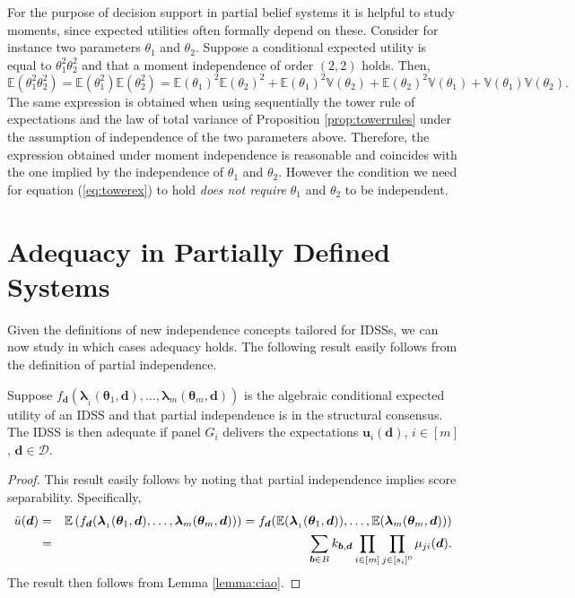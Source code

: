 For the purpose of decision support in partial belief systems it is helpful to study moments, since expected utilities often formally depend on these. Consider for instance two parameters $\theta_1$ and $\theta_2$. Suppose a conditional expected utility is equal to $\theta_1^2\theta_2^2$ and that a moment independence of order $(2,2)$ holds. Then,
\begin{equation}
\mathbb{E}\left(\theta_1^2\theta_2^2\right)=\mathbb{E}\left(\theta_1^2\right)\mathbb{E}\left(\theta_2^2\right)=\mathbb{E}(\theta_1)^2\mathbb{E}(\theta_2)^2+\mathbb{E}(\theta_1)^2\mathbb{V}(\theta_2)+\mathbb{E}(\theta_2)^2\mathbb{V}(\theta_1)+\mathbb{V}(\theta_1)\mathbb{V}(\theta_2).
\label{eq:towerex}
\end{equation}
The same expression is obtained when using sequentially the tower rule of expectations and the law of total variance of Proposition \ref{prop:towerrules} under the assumption of independence of the two parameters above. Therefore, the expression obtained under moment independence is reasonable and coincides with the one implied by the independence of $\theta_1$ and $\theta_2$. However the condition we need for equation (\ref{eq:towerex}) to hold \textit{does not require} $\theta_1$ and $\theta_2$ to be independent. 

\section{Adequacy in Partially Defined Systems}
\label{sec:adequacy1}

 Given the definitions of new independence concepts tailored for IDSSs, we can now study in which cases adequacy holds. The following result easily follows from the definition of partial independence.
 
\begin{lemma}
\label{lemma:ciaociao}
Suppose $f_{\bm{d}}(\bm{\lambda }_{_{1}}(\bm{\theta }_{1},\bm{d}),\dots,\bm{\lambda }_{m}(\bm{\theta }_{m},\bm{d}))$ is the algebraic conditional expected utility of an IDSS and that partial independence is in the structural consensus. The IDSS is then adequate if panel $G_i$ delivers the expectations $\bm{u}_i(\bm{d})$, $i\in[m]$, $\bm{d}\in\bm{\mathcal{D}}$.
\end{lemma}
\begin{proof}
This result easily follows by noting that partial independence implies score separability. Specifically,
\begin{eqnarray*}
\bar{u}(\bm{d})&=&\mathbb{E}\left(f_{\bm{d}}(\bm{\lambda }_{_{1}}(\bm{\theta }_{1},\bm{d}),\dots,\bm{\lambda }_{m}(\bm{\theta }_{m},\bm{d}))\right)=f_{\bm{d}}(\mathbb{E}(\bm{\lambda }_{_{1}}(\bm{\theta }_{1},\bm{d})),\dots,\mathbb{E}(\bm{\lambda }_{m}(\bm{\theta }_{m},\bm{d})))\\
&=&\sum_{\bm{b}\in B}k_{\bm{b},\bm{d}} \prod_{i\in[m]}\prod_{j\in[s_i]^0}\mu_{ji}(\bm{d}).
\end{eqnarray*}
The result then follows from Lemma \ref{lemma:ciao}.
\end{proof}

